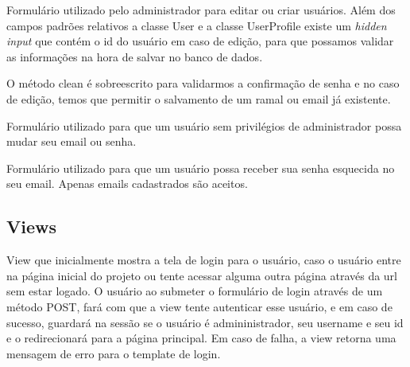 \documentclass[letterpaper,10pt,brazil]{sphinxmanual}
\begin{document}
\begin{fulllineitems}
\label{apps/accounts:accounts.forms.UserForm}
Formulário utilizado pelo administrador para editar ou criar usuários. Além dos campos padrões relativos a classe User e a classe UserProfile existe um \emph{hidden input} que contém o id do usuário em caso de edição, para que possamos validar as informações na hora de salvar no banco de dados.

O método clean é sobreescrito para validarmos a confirmação de senha e no caso de edição, temos que permitir o salvamento de um ramal ou email já existente.

\end{fulllineitems}


\begin{fulllineitems}
\label{apps/accounts:accounts.forms.OnlyUserForm}
Formulário utilizado para que um usuário sem privilégios de administrador possa mudar seu email ou senha.

\end{fulllineitems}


\begin{fulllineitems}
\label{apps/accounts:accounts.forms.PassResetForm}
Formulário utilizado para que um usuário possa receber sua senha esquecida no seu email. Apenas emails cadastrados são aceitos.

\end{fulllineitems}



\subsection{Views}
\label{apps/accounts:module-accounts.views}\label{apps/accounts:views}

\begin{fulllineitems}
\label{apps/accounts:accounts.views.login}
View que inicialmente mostra a tela de login para o usuário, caso o usuário entre na página inicial do projeto ou tente acessar alguma outra página através da url sem estar logado. O usuário ao submeter o formulário de login através de um método POST, fará com que a view tente autenticar esse usuário, e em caso de sucesso, guardará na sessão se o usuário é admininistrador, seu username e seu id e o redirecionará para a página principal. Em caso de falha, a view retorna uma mensagem de erro para o template de login.

\end{fulllineitems}
\end{document}
